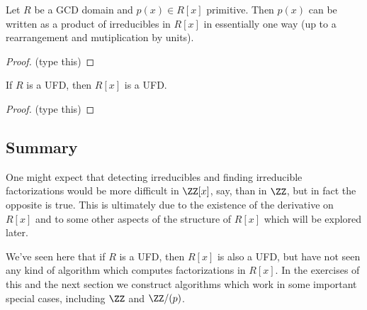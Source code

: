 \documentclass{article}
\begin{document}

\begin{prop}
Let $R$ be a GCD domain and $p(x) \in R[x]$ primitive. Then $p(x)$ can be written as a product of irreducibles in $R[x]$ in essentially one way (up to a rearrangement and mutiplication by units).
\end{prop}

\begin{proof}
(type this)
\end{proof}

\begin{cor}
If $R$ is a UFD, then $R[x]$ is a UFD.
\end{cor}

\begin{proof}
(type this)
\end{proof}

\subsection*{Summary}

\begin{center}
\end{center}

One might expect that detecting irreducibles and finding irreducible factorizations would be more difficult in $\ZZ[x]$, say, than in $\ZZ$, but in fact the opposite is true. This is ultimately due to the existence of the derivative on $R[x]$ and to some other aspects of the structure of $R[x]$ which will be explored later.

We've seen here that if $R$ is a UFD, then $R[x]$ is also a UFD, but have not seen any kind of algorithm which computes factorizations in $R[x]$. In the exercises of this and the next section we construct algorithms which work in some important special cases, including $\ZZ$ and $\ZZ/(p)$.
\end{document}
